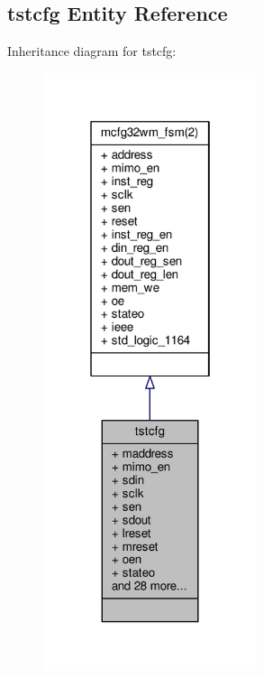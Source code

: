 \subsection{tstcfg Entity Reference}
\label{clasststcfg}


Inheritance diagram for tstcfg\+:\nopagebreak
\begin{figure}[H]
\begin{center}
\leavevmode
\includegraphics[width=178pt]{dc/df1/clasststcfg__inherit__graph}
\end{center}
\end{figure}


